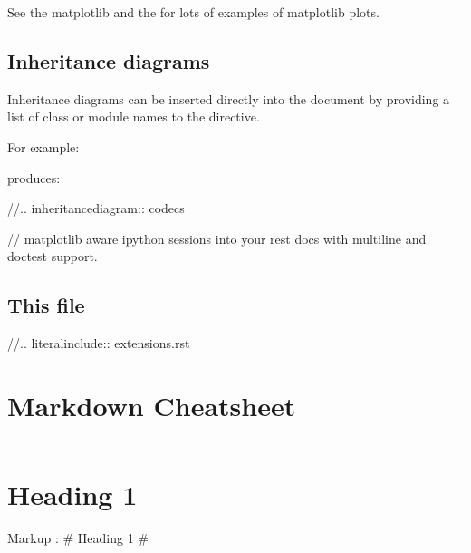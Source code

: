 \documentclass[letterpaper,10pt,english]{sphinxmanual}
\begin{document}
\sphinxAtStartPar
See the matplotlib  and
the  for
lots of examples of matplotlib plots.


\section{Inheritance diagrams}
\label{\detokenize{chapter2:inheritance-diagrams}}
\sphinxAtStartPar
Inheritance diagrams can be inserted directly into the document by
providing a list of class or module names to the
 directive.

\sphinxAtStartPar
For example:

\begin{sphinxVerbatim}[commandchars=\\\{\}]
  
\end{sphinxVerbatim}

\sphinxAtStartPar
produces:

\sphinxAtStartPar
//.. inheritance\sphinxhyphen{}diagram:: codecs

\sphinxAtStartPar
//
matplotlib aware ipython sessions into your rest docs with multiline
and doctest support.


\section{This file}
\label{\detokenize{chapter2:this-file}}\label{\detokenize{chapter2:extensions-literal}}
\sphinxAtStartPar
//.. literalinclude:: extensions.rst


\chapter{Markdown Cheatsheet}
\label{\detokenize{chapter3:markdown-cheatsheet}}\label{\detokenize{chapter3::doc}}\begin{quote}

\sphinxAtStartPar
{}
\end{quote}


\bigskip\hrule\bigskip



\chapter{Heading 1}
\label{\detokenize{chapter3:heading-1}}
\sphinxAtStartPar
Markup :  \# Heading 1 \#
\end{document}
